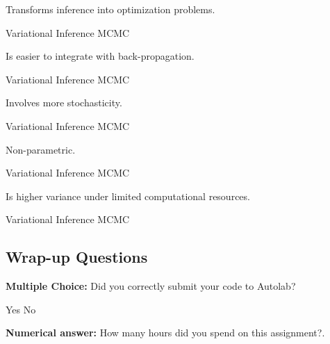 \documentclass[11pt,addpoints,answers]{exam}
\numberwithin{equation}{section} %
\numberwithin{figure}{section} %
\numberwithin{table}{section} %
\begin{document}
\begin{questions}
\question[1]  Transforms inference into optimization problems.

\begin{checkboxes}
     \choice Variational Inference
     \choice MCMC
\end{checkboxes}

\question[1] Is easier to integrate with back-propagation.

\begin{checkboxes}
     \choice Variational Inference
     \choice MCMC
\end{checkboxes}

\question[1] Involves more stochasticity.

\begin{checkboxes}
     \choice Variational Inference
     \choice MCMC
\end{checkboxes}
 
  
\question[1] Non-parametric.  

\begin{checkboxes}
     \choice Variational Inference
     \choice MCMC
\end{checkboxes}


      
\question[1] Is higher variance under limited computational resources.

\begin{checkboxes}
     \choice Variational Inference
     \choice MCMC
\end{checkboxes}
       
     
\end{questions}
\subsection{Wrap-up Questions}

\begin{questions}

\question[1] \textbf{Multiple Choice:} Did you correctly submit your code to Autolab? 
    \begin{checkboxes}
     \choice Yes 
     \choice No
    \end{checkboxes}

\question[1] \textbf{Numerical answer:} How many hours did you spend on this assignment?.
    \begin{tcolorbox}[fit,height=1cm, width=2cm, blank, borderline={1pt}{-2pt}]
    \end{tcolorbox}

\end{questions}
\end{document}
